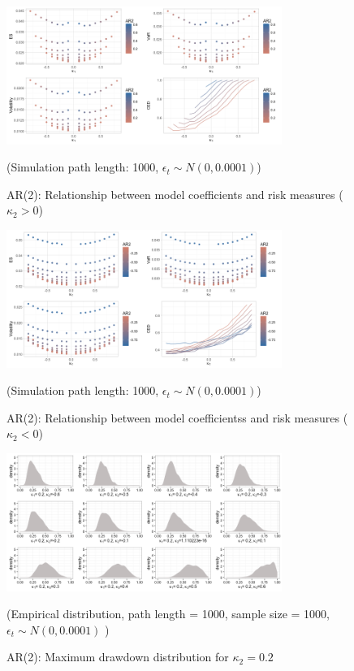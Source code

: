 \documentclass[11pt]{article}
\begin{document}
\begin{figure}[H]
\centering
\includegraphics[width = 0.8\textwidth]{../figures/simulation/AR2_risk_measures_pos_coef}
\caption{AR(2): Relationship between model coefficients and risk measures ($\kappa_2 > 0$)}
(Simulation path length: 1000, $\epsilon_t \sim N(0, 0.0001)$)
\label{fig:AR2_risk_measures_pos_coef}
\end{figure}

\begin{figure}[H]
\centering
\includegraphics[width = 0.8\textwidth]{../figures/simulation/AR2_risk_measures_neg_coef}
\caption{AR(2): Relationship between model coefficientss and risk measures ($\kappa_2 < 0$)}
(Simulation path length: 1000, $\epsilon_t \sim N(0, 0.0001)$)
\label{fig:AR2_risk_measures_neg_coef}
\end{figure}

\begin{figure}[H]
\centering
\includegraphics[width = 0.8\textwidth]{../figures/simulation/AR2_maxDrawdown_dist_kappa1_02}
\caption{AR(2): Maximum drawdown distribution for $\kappa_2 = 0.2$}
(Empirical distribution, path length = 1000, sample size = 1000, $\epsilon_t \sim N(0, 0.0001)$ )
\label{fig:AR2_maxDrawdown_dist_kappa2_02}
\end{figure}
\end{document}

